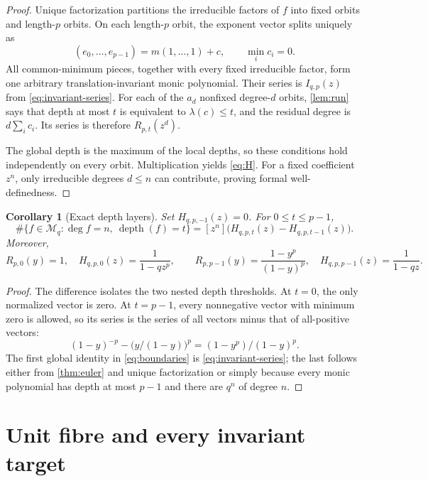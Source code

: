 \documentclass[10pt,a4paper]{amsart}
\newtheorem{corollary}[theorem]{Corollary}
\theoremstyle{definition}
\theoremstyle{remark}
\newcommand{\Mon}{\mathcal M}
\newcommand{\depth}{\operatorname{depth}}
\begin{document}
\begin{proof}
Unique factorization partitions the irreducible factors of $f$ into fixed
orbits and length-$p$ orbits.  On each length-$p$ orbit, the exponent vector
splits uniquely as
\[
       (e_0,\ldots,e_{p-1})=m(1,\ldots,1)+c,
       \qquad \min_i c_i=0.
\]
All common-minimum pieces, together with every fixed irreducible factor,
form one arbitrary translation-invariant monic polynomial.  Their series is
$I_{q,p}(z)$ from \eqref{eq:invariant-series}.  For each of the $a_d$
nonfixed degree-$d$ orbits, \cref{lem:run} says that depth at most $t$ is
equivalent to $\lambda(c)\leq t$, and the residual degree is
$d\sum_i c_i$.  Its series is therefore $R_{p,t}(z^d)$.

The global depth is the maximum of the local depths, so these conditions
hold independently on every orbit.  Multiplication yields \eqref{eq:H}.
For a fixed coefficient $z^n$, only irreducible degrees $d\leq n$ can
contribute, proving formal well-definedness.
\end{proof}

\begin{corollary}[Exact depth layers]\label{cor:layers}
Set $H_{q,p,-1}(z)=0$.  For $0\leq t\leq p-1$,
\[
 \#\{f\in\Mon_q:\deg f=n,\ \depth(f)=t\}
   =[z^n]\bigl(H_{q,p,t}(z)-H_{q,p,t-1}(z)\bigr).
\]
Moreover,
\begin{equation}\label{eq:boundaries}
 R_{p,0}(y)=1,\quad H_{q,p,0}(z)=\frac1{1-qz^p},\qquad
 R_{p,p-1}(y)=\frac{1-y^p}{(1-y)^p},\quad
 H_{q,p,p-1}(z)=\frac1{1-qz}.
\end{equation}
\end{corollary}

\begin{proof}
The difference isolates the two nested depth thresholds.  At $t=0$, the
only normalized vector is zero.  At $t=p-1$, every nonnegative vector with
minimum zero is allowed, so its series is the series of all vectors minus
that of all-positive vectors:
\[
 (1-y)^{-p}-\bigl(y/(1-y)\bigr)^p
   =(1-y^p)/(1-y)^p.
\]
The first global identity in \eqref{eq:boundaries} is
\eqref{eq:invariant-series}; the last follows either from
\cref{thm:euler} and unique factorization or simply because every monic
polynomial has depth at most $p-1$ and there are $q^n$ of degree $n$.
\end{proof}

\section{Unit fibre and every invariant target}
\end{document}

